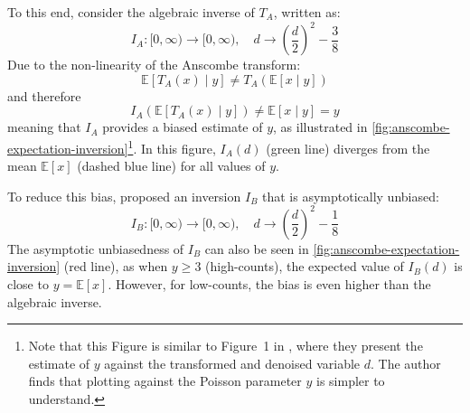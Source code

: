 To this end, consider the algebraic inverse of $T_A$, written as:
\begin{equation}
    I_A: [0, \infty) \to [0, \infty), \quad d \to \left(\frac{d}{2} \right)^2 - \frac{3}{8}
\end{equation}
Due to the non-linearity of the Anscombe transform:
\begin{equation*}
    \mathbb{E}[T_A(x) \mid y] \neq T_A(\mathbb{E}[x \mid y])
\end{equation*}
and therefore
\begin{equation*}
    I_A(\mathbb{E}[T_A(x) \mid y]) \neq \mathbb{E}[x \mid y] = y
\end{equation*}
meaning that $I_A$ provides a biased estimate of $y$, as illustrated in \cref{fig:anscombe-expectation-inversion}\footnote{Note that this Figure is similar to Figure~1 in \cite{makitaloOptimalInversionAnscombe2011}, where they present the estimate of $y$ against the transformed and denoised variable $d$. The author finds that plotting against the Poisson parameter $y$ is simpler to understand.}. In this figure, $I_A(d)$ (green line) diverges from the mean $\mathbb{E}[x]$ (dashed blue line) for all values of $y$. 

To reduce this bias, \citeauthor{anscombeTransformationPoissonBinomial1948} \cite{anscombeTransformationPoissonBinomial1948} proposed an inversion $I_B$ that is asymptotically unbiased:
\begin{equation}
    I_B: [0, \infty) \to [0, \infty), \quad d \to \left(\frac{d}{2} \right)^2 - \frac{1}{8}
\end{equation}
The asymptotic unbiasedness of $I_B$ can also be seen in \cref{fig:anscombe-expectation-inversion} (red line), as when $y \geq 3$ (high-counts), the expected value of $I_B(d)$ is close to $y=\mathbb{E}[x]$. However, for low-counts, the bias is even higher than the algebraic inverse.


